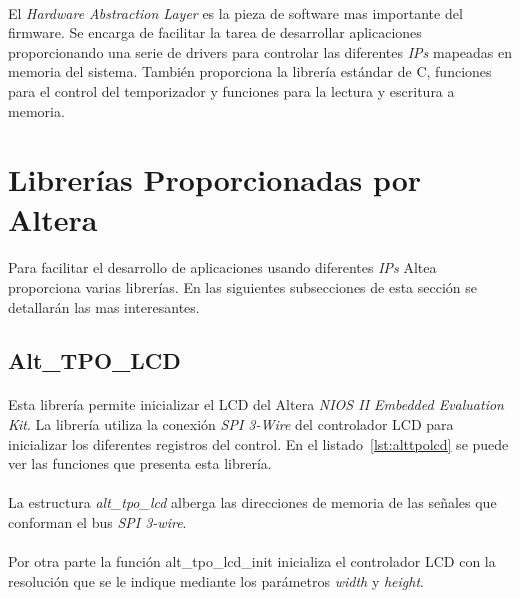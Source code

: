\documentclass[a4paper,12pt,titlepage,final]{book}
\begin{document}
\paragraph{}
El \textit{Hardware Abstraction Layer} es la pieza de software mas importante del firmware. Se encarga de facilitar la tarea de desarrollar aplicaciones proporcionando una serie de drivers para controlar las diferentes \textit{IPs} mapeadas en memoria del sistema. También proporciona la librería estándar de C, funciones para el control del temporizador y funciones para la lectura y escritura a memoria.

\section{Librerías Proporcionadas por Altera}
\paragraph{}
Para facilitar el desarrollo de aplicaciones usando diferentes \textit{IPs} Altea proporciona varias librerías. En las siguientes subsecciones de esta sección se detallarán las mas interesantes.
\subsection{Alt\_TPO\_LCD}

\paragraph{}
Esta librería permite inicializar el LCD del Altera \textit{NIOS II Embedded Evaluation Kit}. La librería utiliza la conexión \textit{SPI 3-Wire} del controlador LCD para inicializar los diferentes registros del control. En el listado~\ref{lst:alttpolcd} se puede ver las funciones que presenta esta librería.



\paragraph{}
La estructura \textit{alt\_tpo\_lcd} alberga las direcciones de memoria de las señales que conforman el bus \textit{SPI 3-wire}.

\paragraph{}
Por otra parte la función alt\_tpo\_lcd\_init inicializa el controlador LCD con la resolución que se le indique mediante los parámetros \textit{width} y \textit{height}.
\end{document}

